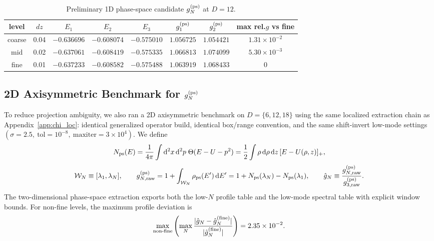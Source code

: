 \documentclass[aps,prd,onecolumn,notitlepage,nofootinbib,superscriptaddress,11pt,floatfix]{revtex4-2}
\newcommand{\dd}{\mathrm{d}}
\begin{document}
\begin{table}[t]
\centering
\caption{Preliminary 1D phase-space candidate $g_N^{\rm(ps)}$ at $D=12$.}
\label{tab:gn_ps_d12}
\small
\begin{tabular}{cccccccc}
\hline\hline
level & $dz$ & $E_1$ & $E_2$ & $E_3$ & $g_1^{\rm(ps)}$ & $g_2^{\rm(ps)}$ & max rel.$g$ vs fine \\
\hline
coarse & 0.04 & $-0.636696$ & $-0.608074$ & $-0.575010$ & $1.056725$ & $1.054421$ & $1.31\times10^{-2}$ \\
mid    & 0.02 & $-0.637061$ & $-0.608419$ & $-0.575335$ & $1.066813$ & $1.074099$ & $5.30\times10^{-3}$ \\
fine   & 0.01 & $-0.637233$ & $-0.608582$ & $-0.575488$ & $1.063919$ & $1.068433$ & $0$ \\
\hline\hline
\end{tabular}
\end{table}

\subsection{2D Axisymmetric Benchmark for \texorpdfstring{$g_N^{\rm(ps)}$}{gN(ps)}}
To reduce projection ambiguity, we also ran a 2D axisymmetric benchmark on $D=\{6,12,18\}$ using the same localized extraction chain as Appendix~\ref{app:chi_loc}: identical generalized operator build, identical box/range convention, and the same shift-invert low-mode settings $(\sigma=2.5,\ \mathrm{tol}=10^{-8},\ \mathrm{maxiter}=3\times10^4)$. We define
\begin{equation}
N_{\rm ps}(E)=\frac{1}{4\pi}\int \dd^2x\,\dd^2p\;\Theta(E-U-p^2)
=\frac{1}{2}\int \rho\,\dd\rho\,\dd z\,[E-U(\rho,z)]_+,
\end{equation}
\begin{equation}
\mathcal{W}_N\equiv[\lambda_1,\lambda_N],\qquad
g_{N,\rm raw}^{\rm(ps)}=1+\int_{\mathcal{W}_N}\rho_{\rm ps}(E')\,\dd E'
=1+N_{\rm ps}(\lambda_N)-N_{\rm ps}(\lambda_1),\qquad
\hat g_N\equiv\frac{g_{N,\rm raw}^{\rm(ps)}}{g_{3,\rm raw}^{\rm(ps)}}.
\end{equation}
The two-dimensional phase-space extraction exports both the low-$N$ profile table and the low-mode spectral table with explicit window bounds. For non-fine levels, the maximum profile deviation is
\begin{equation}
\max_{\text{non-fine}}\left(\max_N\frac{|\hat g_N-\hat g_N^{\rm(fine)}|}{|\hat g_N^{\rm(fine)}|}\right)=2.35\times10^{-2}.
\end{equation}
\end{document}
